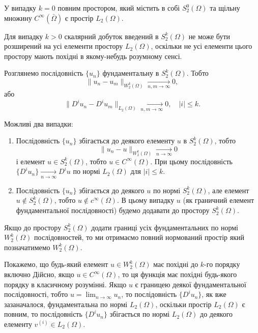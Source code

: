 У випадку $k = 0$ повним простором, який містить в собі $S_2^0(\Omega)$ та щільну %
множину $C^\infty(\bar \Omega)$ є простір $L_2(\Omega)$. \medskip

Для випадку $k > 0$ скалярний добуток введений в $S_2^k(\Omega)$ не може бути розширений на усі елементи простору $L_2(\Omega)$, оскільки не усі елементи цього простору мають похідні в якому-небудь розумному сенсі. \medskip

Розглянемо послідовність $\{u_n\}$ фундаментальну в $S_2^k(\Omega)$. Тобто
\begin{equation*}
    \|u_n - u_m\|_{W_2^k(\Omega)} \xrightarrow[n, m \to \infty]{} 0,
\end{equation*}
або
\begin{equation*}
    \|D^i u_n - D^i u_m\|_{L_2(\Omega)} \xrightarrow[n, m \to \infty]{} 0, \quad |i| \le k.    
\end{equation*}

Можливі два випадки:
\begin{enumerate}
    \item Послідовність $\{u_n\}$ збігається до деякого елементу $u$ в $S_2^k(\Omega)$, тобто
    \begin{equation*}
        \|u_n - u\|_{W_2^k(\Omega)} \xrightarrow[n \to \infty]{} 0
    \end{equation*}
    і елемент $u \in S_2^k(\Omega)$, тобто $u \in C^\infty(\Omega)$. При цьому послідовність $\{D^i u_n\} \xrightarrow[n \to \infty]{} D^i u$ по нормі $L_2(\Omega)$ для $|i| \le k$.

    \item Послідовність $\{u_n\}$ збігається до деякого $u$ по нормі $S_2^k(\Omega)$, але елемент $u \not\in S_2^k(\Omega)$, тобто $u \not\in c^\infty(\Omega)$. В цьому випадку $u$ (як граничний елемент фундаментальної послідовності) будемо додавати до простору $S_2^k(\Omega)$.
\end{enumerate}

Якщо до простору $S_2^k(\Omega)$ додати границі усіх фундаментальних по нормі $W_2^k(\Omega)$ послідовностей, то ми отримаємо повний нормований простір який позначатимемо $W_2^k(\Omega)$. \medskip

Покажемо, що будь-який елемент $u \in W_2^k(\Omega)$ має похідні до $k$-го порядку включно Дійсно, якщо $u \in C^\infty(\Omega)$, то ця функція має похідні будь-якого порядку в класичному розумінні. Якщо $u$ є границею деякої фундаментальної послідовності, тобто $u = \lim_{n \to \infty} u_n$, то послідовність $\{D^i u_n\}$, як вже зазаначалося, фундаментальна по нормі $L_2(\Omega)$, оскільки простір $L_2(\Omega)$ є повним, то послідовність $\{D^i u_n\}$ збігається по нормі $L_2(\Omega)$ до деякого елементу $v^{(i)} \in L_2(\Omega)$.

